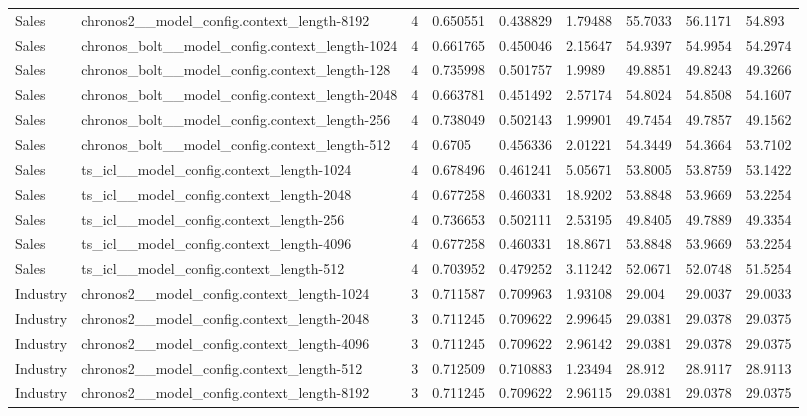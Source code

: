 \begin{tabular}{lllllllll}
Sales & chronos2\_\_model\_config.context\_length-8192 & 4 & 0.650551 & 0.438829 & 1.79488 & 55.7033 & 56.1171 & 54.893 \\
Sales & chronos\_bolt\_\_model\_config.context\_length-1024 & 4 & 0.661765 & 0.450046 & 2.15647 & 54.9397 & 54.9954 & 54.2974 \\
Sales & chronos\_bolt\_\_model\_config.context\_length-128 & 4 & 0.735998 & 0.501757 & 1.9989 & 49.8851 & 49.8243 & 49.3266 \\
Sales & chronos\_bolt\_\_model\_config.context\_length-2048 & 4 & 0.663781 & 0.451492 & 2.57174 & 54.8024 & 54.8508 & 54.1607 \\
Sales & chronos\_bolt\_\_model\_config.context\_length-256 & 4 & 0.738049 & 0.502143 & 1.99901 & 49.7454 & 49.7857 & 49.1562 \\
Sales & chronos\_bolt\_\_model\_config.context\_length-512 & 4 & 0.6705 & 0.456336 & 2.01221 & 54.3449 & 54.3664 & 53.7102 \\
Sales & ts\_icl\_\_model\_config.context\_length-1024 & 4 & 0.678496 & 0.461241 & 5.05671 & 53.8005 & 53.8759 & 53.1422 \\
Sales & ts\_icl\_\_model\_config.context\_length-2048 & 4 & 0.677258 & 0.460331 & 18.9202 & 53.8848 & 53.9669 & 53.2254 \\
Sales & ts\_icl\_\_model\_config.context\_length-256 & 4 & 0.736653 & 0.502111 & 2.53195 & 49.8405 & 49.7889 & 49.3354 \\
Sales & ts\_icl\_\_model\_config.context\_length-4096 & 4 & 0.677258 & 0.460331 & 18.8671 & 53.8848 & 53.9669 & 53.2254 \\
Sales & ts\_icl\_\_model\_config.context\_length-512 & 4 & 0.703952 & 0.479252 & 3.11242 & 52.0671 & 52.0748 & 51.5254 \\
Industry & chronos2\_\_model\_config.context\_length-1024 & 3 & 0.711587 & 0.709963 & 1.93108 & 29.004 & 29.0037 & 29.0033 \\
Industry & chronos2\_\_model\_config.context\_length-2048 & 3 & 0.711245 & 0.709622 & 2.99645 & 29.0381 & 29.0378 & 29.0375 \\
Industry & chronos2\_\_model\_config.context\_length-4096 & 3 & 0.711245 & 0.709622 & 2.96142 & 29.0381 & 29.0378 & 29.0375 \\
Industry & chronos2\_\_model\_config.context\_length-512 & 3 & 0.712509 & 0.710883 & 1.23494 & 28.912 & 28.9117 & 28.9113 \\
Industry & chronos2\_\_model\_config.context\_length-8192 & 3 & 0.711245 & 0.709622 & 2.96115 & 29.0381 & 29.0378 & 29.0375 \\

\end{tabular}

